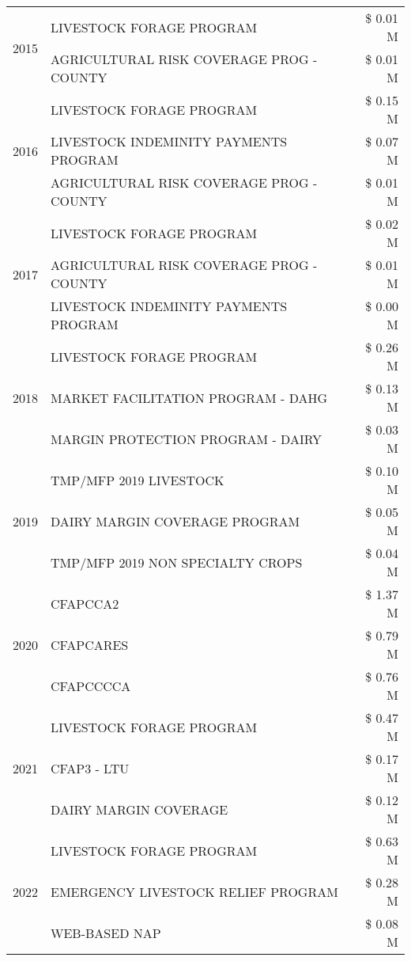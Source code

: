 \begin{tabular}{llr}
\multirow[t]{2}{*}{2015} & LIVESTOCK FORAGE PROGRAM & \$ 0.01 M \\
 & AGRICULTURAL RISK COVERAGE PROG - COUNTY & \$ 0.01 M \\
\cline{1-3}
\multirow[t]{3}{*}{2016} & LIVESTOCK FORAGE PROGRAM & \$ 0.15 M \\
 & LIVESTOCK INDEMINITY PAYMENTS PROGRAM & \$ 0.07 M \\
 & AGRICULTURAL RISK COVERAGE PROG - COUNTY & \$ 0.01 M \\
\cline{1-3}
\multirow[t]{3}{*}{2017} & LIVESTOCK FORAGE PROGRAM & \$ 0.02 M \\
 & AGRICULTURAL RISK COVERAGE PROG - COUNTY & \$ 0.01 M \\
 & LIVESTOCK INDEMINITY PAYMENTS PROGRAM & \$ 0.00 M \\
\cline{1-3}
\multirow[t]{3}{*}{2018} & LIVESTOCK FORAGE PROGRAM & \$ 0.26 M \\
 & MARKET FACILITATION PROGRAM - DAHG & \$ 0.13 M \\
 & MARGIN PROTECTION PROGRAM - DAIRY & \$ 0.03 M \\
\cline{1-3}
\multirow[t]{3}{*}{2019} & TMP/MFP 2019 LIVESTOCK & \$ 0.10 M \\
 & DAIRY MARGIN COVERAGE PROGRAM & \$ 0.05 M \\
 & TMP/MFP 2019 NON SPECIALTY CROPS & \$ 0.04 M \\
\cline{1-3}
\multirow[t]{3}{*}{2020} & CFAPCCA2 & \$ 1.37 M \\
 & CFAPCARES & \$ 0.79 M \\
 & CFAPCCCCA & \$ 0.76 M \\
\cline{1-3}
\multirow[t]{3}{*}{2021} & LIVESTOCK FORAGE PROGRAM & \$ 0.47 M \\
 & CFAP3 - LTU & \$ 0.17 M \\
 & DAIRY MARGIN COVERAGE & \$ 0.12 M \\
\cline{1-3}
\multirow[t]{3}{*}{2022} & LIVESTOCK FORAGE PROGRAM & \$ 0.63 M \\
 & EMERGENCY LIVESTOCK RELIEF PROGRAM & \$ 0.28 M \\
 & WEB-BASED NAP & \$ 0.08 M \\
\cline{1-3}
\bottomrule
\end{tabular}
